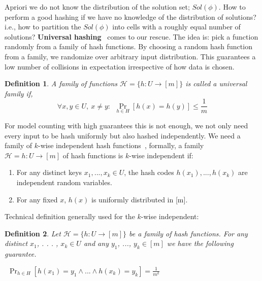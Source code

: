 \documentclass{article}
\newtheorem{definition}{Definition}
\begin{document}
Apriori we do not know the distribution of the solution set; $Sol(\phi)$.
%
How to perform a good hashing if we have no knowledge of the distribution of solutions? i.e., how to partition the $Sol(\phi)$ into cells with a roughly equal number of solutions?
%
\textbf{Universal hashing}~\cite{DBLP:conf/stoc/CarterW77} comes to our rescue.
%
The idea is: pick a function randomly from a family of hash functions.  By choosing a random hash function from a family, we randomize over arbitrary input distribution. This guarantees a low number of collisions in expectation irrespective of how data is chosen.
%

\begin{definition}
A family of functions $\mathcal{H}=\{h: U \to [m]\}$  is called a universal family if,
\[ \forall x,y\in U,~x\neq y:~~\Pr _{h\in H}[h(x)=h(y)]\leq {\frac {1}{m}} \]
\end{definition}

For model counting with high guarantees this is not enough, we not only need every input to be hash uniformly but also hashed independently. We need a family of $k$-wise independent hash functions~\cite{DBLP:conf/focs/WegmanC79},
%
formally,
a family $\mathcal{H} = {h : U \to [m]}$ of hash functions
is $k$-wise independent if:
\begin{enumerate}
	\item For any distinct keys $x_1, ..., x_k \in U$, the hash codes
	$h(x_1), ..., h(x_k)$ are independent random variables.
	\item For any fixed $x$, $h(x)$ is uniformly distributed in [m].
\end{enumerate}

Technical definition generally used for the $k$-wise independent:
\begin{definition}
	Let $\mathcal{H}=\{h: U \to [m]\}$ be a family of hash functions. For any distinct $x_1$, . . . , $x_k \in U$ and any $y_1$, ..., $y_k \in [m]$ we have the following guarantee.

	$~~\Pr_{h\in H}
	[h(x_1) = y_1 \land ... \land h(x_k) = y_k] = \frac {1}
	{m^
		k}$
\end{definition}
\end{document}
